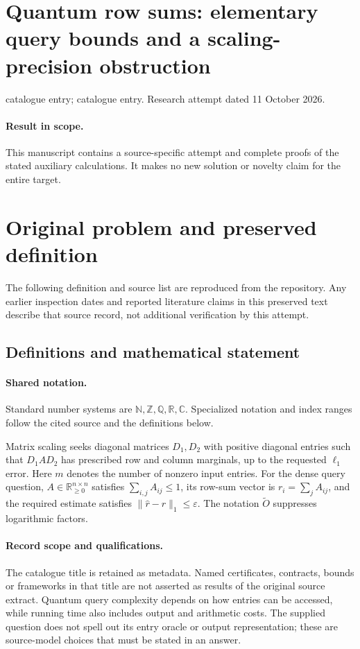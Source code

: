 \documentclass[11pt]{article}
\begin{document}
\section*{Quantum row sums: elementary query bounds and a scaling-precision obstruction}
\noindent catalogue entry; catalogue entry. Research attempt dated 11 October 2026.
\paragraph{Result in scope.}This manuscript contains a source-specific attempt and complete proofs of the stated auxiliary calculations. It makes no new solution or novelty claim for the entire target.
\section{Original problem and preserved definition}
The following definition and source list are reproduced from the repository. Any earlier inspection dates and reported literature claims in this preserved text describe that source record, not additional verification by this attempt.
\subsection{Definitions and mathematical statement}

\paragraph{Shared notation.}Standard number systems are $\mathbb N,\mathbb Z,\mathbb Q,\mathbb R,\mathbb C$. Specialized notation and index ranges follow the cited source and the definitions below.


Matrix scaling seeks diagonal matrices $D_1,D_2$ with positive diagonal entries such that $D_1AD_2$ has prescribed row and column marginals, up to the requested $\ell_1$ error. Here $m$ denotes the number of nonzero input entries. For the dense query question, $A\in\mathbb R_{\geq0}^{n\times n}$ satisfies $\sum_{i,j}A_{ij}\leq1$, its row-sum vector is $r_i=\sum_jA_{ij}$, and the required estimate satisfies $\|\widehat r-r\|_1\leq\varepsilon$. The notation $\widetilde O$ suppresses logarithmic factors.
\paragraph{Record scope and qualifications.}
The catalogue title is retained as metadata. Named certificates, contracts, bounds or frameworks in that title are not asserted as results of the original source extract.
Quantum query complexity depends on how entries can be accessed, while running time also includes output and arithmetic costs. The supplied question does not spell out its entry oracle or output representation; these are source-model choices that must be stated in an answer.
\end{document}
